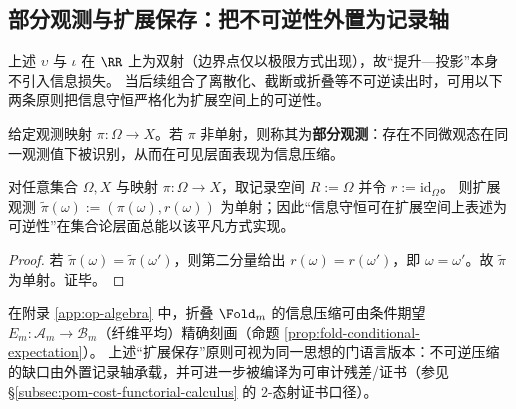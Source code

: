 \subsection{部分观测与扩展保存：把不可逆性外置为记录轴}\label{subsec:unit-circle-phase-information}
上述 \(\upsilon\) 与 \(\iota\) 在 \(\RR\) 上为双射（边界点仅以极限方式出现），故“提升—投影”本身不引入信息损失。
当后续组合了离散化、截断或折叠等不可逆读出时，可用以下两条原则把信息守恒严格化为扩展空间上的可逆性。

\begin{definition}[部分观测]\label{def:unit-circle-phase-partial-observation}
给定观测映射 \(\pi:\Omega\to X\)。若 \(\pi\) 非单射，则称其为\textbf{部分观测}：存在不同微观态在同一观测值下被识别，从而在可见层面表现为信息压缩。
\end{definition}

\begin{proposition}\label{prop:unit-circle-phase-extension-preserving}
对任意集合 \(\Omega,X\) 与映射 \(\pi:\Omega\to X\)，取记录空间 \(R:=\Omega\) 并令 \(r:=\mathrm{id}_\Omega\)。
则扩展观测
\(
\widetilde\pi(\omega):=(\pi(\omega),r(\omega))
\)
为单射；因此“信息守恒可在扩展空间上表述为可逆性”在集合论层面总能以该平凡方式实现。
\end{proposition}
\begin{proof}
若 \(\widetilde\pi(\omega)=\widetilde\pi(\omega')\)，则第二分量给出 \(r(\omega)=r(\omega')\)，即 \(\omega=\omega'\)。故 \(\widetilde\pi\) 为单射。证毕。
\end{proof}

\begin{remark}
在附录 \ref{app:op-algebra} 中，折叠 \(\Fold_m\) 的信息压缩可由条件期望 \(E_m:\mathcal{A}_m\to\mathcal{B}_m\)（纤维平均）精确刻画（命题 \ref{prop:fold-conditional-expectation}）。
上述“扩展保存”原则可视为同一思想的门语言版本：不可逆压缩的缺口由外置记录轴承载，并可进一步被编译为可审计残差/证书（参见 \S\ref{subsec:pom-cost-functorial-calculus} 的 \(2\)-态射证书口径）。
\end{remark}
